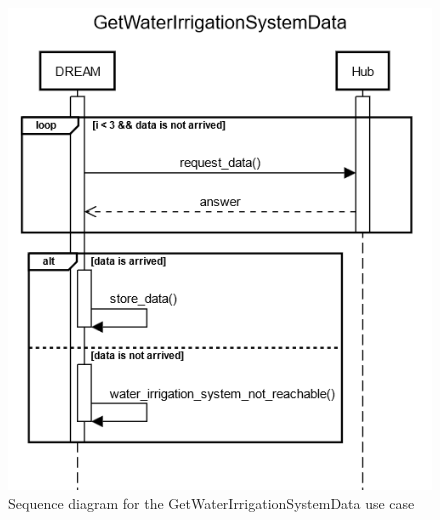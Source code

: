 \documentclass{article}
\begin{document}
\begin{figure}[H]
    \centering
    \includegraphics[scale=0.75]{sequence_diagrams/GetWaterIrrigationSystemData}
    \caption{Sequence diagram for the GetWaterIrrigationSystemData use case}
\end{figure}
\newpage
\end{document}
